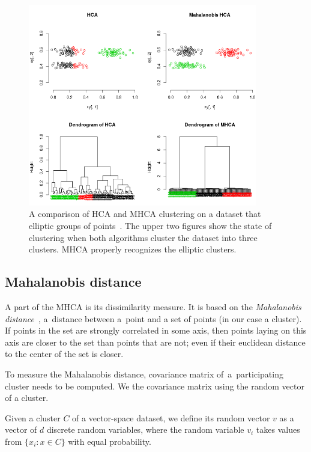 \begin{figure}[t]\centering
	\includegraphics[width=10cm]{img/mhca}
	\caption{A comparison of HCA and MHCA clustering on a dataset that  elliptic groups of points~\cite{fivser2012detection}.  The upper two figures show the state of clustering when both algorithms cluster the dataset into three clusters. MHCA properly recognizes the elliptic clusters.}
	\label{fig01:mhca}
\end{figure}

\subsection{Mahalanobis distance}

A  part of the MHCA is its  dissimilarity measure. It is based on the \emph{Mahalanobis distance}~\cite{mahalanobis1936generalized}, a~distance between a~point and a set of points (in our case a cluster). If points in the set are strongly correlated in some axis, then points laying on this axis are closer to the set than points that are not; even if their euclidean distance to the center of the set is closer.

To measure the Mahalanobis distance,  covariance matrix of~a~participating cluster needs to be computed. We  the covariance matrix using the random vector of a cluster.

\begin{defn}
	Given a cluster $C$ of a vector-space dataset, we define its random vector $v$ as a vector of $d$ discrete random variables, where the random variable $v_i$ takes values from $\{x_i:x\in C\}$ with equal probability.
\end{defn}

